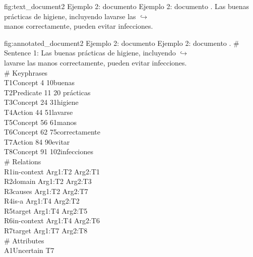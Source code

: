 \begin{annexample}
[backgroundcolor=black!5]
{\textwidth}
{fig:text_document2}
{Ejemplo 2: documento }
{Ejemplo 2: documento .}
	Las buenas prácticas de higiene, incluyendo lavarse las {\scriptsize $\hookrightarrow$}\\
	manos correctamente, pueden evitar infecciones.
\end{annexample}

\begin{annexample}
[backgroundcolor=cyan!13]
{\textwidth}
{fig:annotated_document2}
{Ejemplo 2: documento }
{Ejemplo 2: documento .}
	\# Sentence 1: Las buenas prácticas de higiene, incluyendo {\scriptsize $\hookrightarrow$}\\
	lavarse las manos correctamente, pueden evitar infecciones.\\
	\# Keyphrases\\
	T1\space\space Concept 4 10\space\space\space\space buenas\\
	T2\space\space Predicate 11 20 prácticas\\
	T3\space\space Concept 24 31\space\space\space higiene\\
	T4\space\space Action 44 51\space\space\space\space lavarse\\
	T5\space\space Concept 56 61\space\space\space manos\\
	T6\space\space Concept 62 75\space\space\space correctamente\\
	T7\space\space Action 84 90\space\space\space\space evitar\\
	T8\space\space Concept 91 102\space\space infecciones\\
	\# Relations\\
	R1\space\space in-context Arg1:T2 Arg2:T1\\
	R2\space\space domain Arg1:T2 Arg2:T3\\
	R3\space\space causes Arg1:T2 Arg2:T7\\
	R4\space\space is-a Arg1:T4 Arg2:T2\\
	R5\space\space target Arg1:T4 Arg2:T5\\
	R6\space\space in-context Arg1:T4 Arg2:T6\\
	R7\space\space target Arg1:T7 Arg2:T8\\
	\# Attributes\\
	A1\space\space Uncertain T7
\end{annexample}

